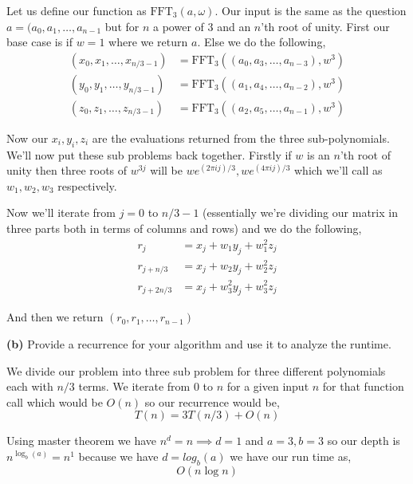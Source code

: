 \documentclass[12pt]{article}
\newcommand{\question}[3][Q]{
\begin{description}
\item \textbf{#1{#2}} #3
\end{description}
}
\begin{document}
\begin{answer}
    Let us define our function as $\text{FFT}_3(a, \omega)$. Our input is the same as the question $a = (a_0, a_1, \dots, a_{n - 1}$ but for $n$ a power of $3$ and an  $n$'th root of unity. First our base case is if $w = 1$ where we return  $a$. Else we do the following,  
    \begin{align*}
        (x_0,x_1,\dots,x_{n /3 - 1}) &= \text{FFT}_3((a_0, a_3, \dots, a_{n - 3}), w^{3})\\
        (y_0,y_1,\dots,y_{n /3 - 1}) &= \text{FFT}_3((a_1, a_4, \dots, a_{n - 2}), w^{3})\\
        (z_0,z_1,\dots,z_{n /3 - 1}) &= \text{FFT}_3((a_2, a_5, \dots, a_{n - 1}), w^{3})
    \end{align*}

    Now our $x_i, y_i, z_i$ are the evaluations returned from the three sub-polynomials. We'll now put these sub problems back together. 
    Firstly if  $w$ is an $n$'th  root of unity  then three roots of $w^{3j}$ will be $we^{(2\pi i j) / 3}, we^{(4\pi i j) /3} $ which we'll call as $w_1,w_2,w_3$ respectively.

    Now we'll iterate from $j = 0$ to  $n /3 - 1$ (essentially we're dividing our matrix in three parts both in terms of columns and rows) and we do the following,  
    \begin{align*}
        r_j &= x_j + w_1 y_j + w_1^2z_j \\
        r_{j + n /3} &= x_j + w_2 y_j + w_2^2 z_j \\
        r_{j + 2n /3} &= x_j + w_3^2 y_j + w_3^2z_j
    \end{align*}

    And then we return $(r_0, r_1, \dots, r_{n - 1})$



\end{answer}


\question[]{(b)}{
    Provide a recurrence for your algorithm and use it to analyze the runtime.
}

\begin{answer}
    We divide our problem into three sub problem for three different polynomials each with $n /3$ terms. We iterate from 0 to  $n$ for a given input  $n$ for that function call which would be $O(n)$ so our recurrence would be, 
    $$ T(n)= 3T(n /3) + O(n) $$ 

    Using master theorem we have $n^{d} = n \implies d= 1$ and $a = 3, b = 3$ so our depth is $n^{\log_b(a)} = n^{1}$ because we have $d = log_b(a)$ we have our run time as, 
    $$ O(n \log n) $$ 
\end{answer}
\end{document}
